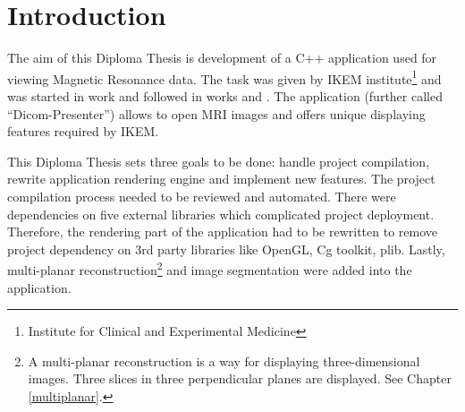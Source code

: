 \chapter{Introduction}
\vspace{-10mm}
The aim of this Diploma Thesis is development of a C++ application used for viewing Magnetic Resonance data. The task was given by IKEM institute\footnote{Institute for Clinical and Experimental Medicine} and was started in work \cite{neskudla} and followed in works \cite{flaska_bc} and \cite{flaska_vu}. The application (further called ``Dicom-Presenter'') allows to open MRI images and offers unique displaying features required by IKEM.

This Diploma Thesis sets three goals to be done: handle project compilation, rewrite application rendering engine and implement new features. The project compilation process needed to be reviewed and automated. There were dependencies on five external libraries which complicated project deployment. Therefore, the rendering part of the application had to be rewritten to remove project dependency on 3rd party libraries like OpenGL, Cg toolkit, plib. Lastly, multi-planar reconstruction\footnote{A multi-planar reconstruction is a way for displaying three-dimensional images. Three slices in three perpendicular planes are displayed. See Chapter \ref{multiplanar}.} and image segmentation were added into the application.
